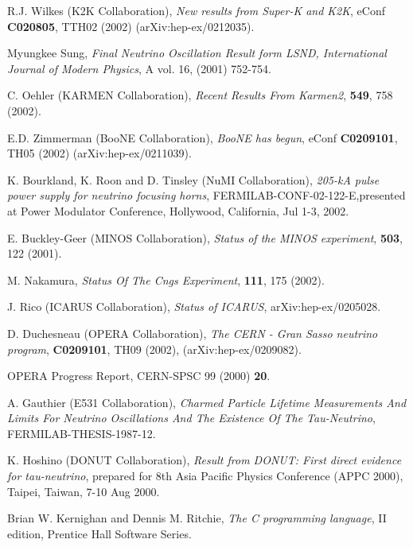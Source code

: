 \begin{thebibliography}{99}
 R.J. Wilkes (K2K Collaboration), \emph{New results from Super-K and K2K}, eConf \textbf{C020805}, TTH02 (2002) (arXiv:hep-ex/0212035).

 Myungkee Sung, \emph{Final Neutrino Oscillation Result form LSND, International Journal of Modern Physics}, A vol. 16, (2001) 752-754.

 C. Oehler (KARMEN Collaboration), \emph{Recent Results From Karmen2}, \textbf{549}, 758 (2002).

 E.D. Zimmerman (BooNE Collaboration), \emph{BooNE has begun}, eConf \textbf{C0209101}, TH05 (2002) (arXiv:hep-ex/0211039).




 K. Bourkland, K. Roon and D. Tinsley (NuMI Collaboration), \emph{205-kA pulse power supply for neutrino focusing horns}, FERMILAB-CONF-02-122-E,presented at Power Modulator Conference, Hollywood, California, Jul 1-3, 2002.

 E. Buckley-Geer (MINOS Collaboration), \emph{Status of the MINOS experiment}, \textbf{503}, 122 (2001).

 M. Nakamura, \emph{Status Of The Cngs Experiment}, \textbf{111}, 175 (2002).

 J. Rico (ICARUS Collaboration), \emph{Status of ICARUS}, arXiv:hep-ex/0205028.

 D. Duchesneau (OPERA Collaboration), \emph{The CERN - Gran Sasso neutrino program}, \textbf{C0209101}, TH09 (2002), (arXiv:hep-ex/0209082).

 OPERA Progress Report, CERN-SPSC 99 (2000) \textbf{20}.

 A. Gauthier (E531 Collaboration), \emph{Charmed Particle Lifetime Measurements And Limits For Neutrino Oscillations And The Existence Of The Tau-Neutrino}, FERMILAB-THESIS-1987-12.

 K. Hoshino (DONUT Collaboration), \emph{Result from DONUT: First direct evidence for tau-neutrino}, prepared for 8th Asia Pacific Physics Conference (APPC 2000), Taipei, Taiwan, 7-10 Aug 2000.




 Brian W. Kernighan and Dennis M. Ritchie, \emph{The C programming language}, II edition, Prentice Hall Software Series.


\end{thebibliography}
